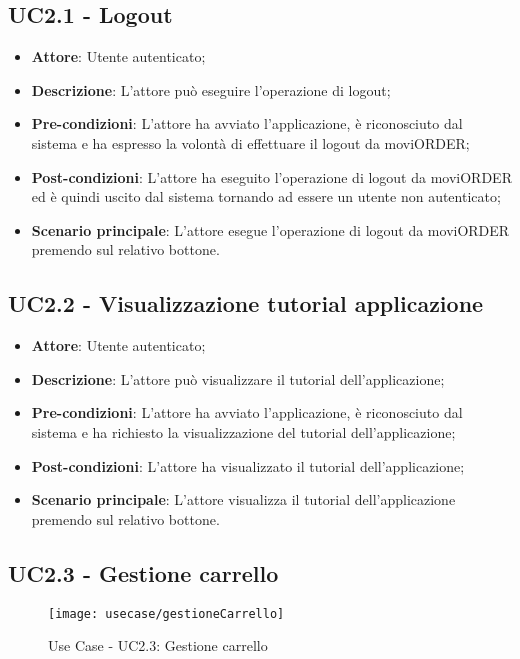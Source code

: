 \subsection{UC2.1 - Logout}

\begin{itemize}
	\item \textbf{Attore}: Utente autenticato;
	\item \textbf{Descrizione}: L'attore può eseguire l'operazione di logout;
	\item \textbf{Pre-condizioni}: L'attore ha avviato l'applicazione, è riconosciuto dal sistema e ha espresso la volontà di effettuare il logout da moviORDER;
	\item \textbf{Post-condizioni}: L'attore ha eseguito l'operazione di logout da moviORDER ed è quindi uscito dal sistema tornando ad essere un utente non autenticato;
	\item \textbf{Scenario principale}: L'attore esegue l'operazione di logout da moviORDER premendo sul relativo bottone.
\end{itemize}

\subsection{UC2.2 - Visualizzazione tutorial applicazione}

\begin{itemize}
	\item \textbf{Attore}: Utente autenticato;
	\item \textbf{Descrizione}: L'attore può visualizzare il tutorial dell'applicazione;
	\item \textbf{Pre-condizioni}: L'attore ha avviato l'applicazione, è riconosciuto dal sistema e ha richiesto la visualizzazione del tutorial dell'applicazione;
	\item \textbf{Post-condizioni}: L'attore ha visualizzato il tutorial dell'applicazione;
	\item \textbf{Scenario principale}: L'attore visualizza il tutorial dell'applicazione premendo sul relativo bottone.
\end{itemize}

\newpage

\subsection{UC2.3 - Gestione carrello}

\begin{figure}[!h] 
    \centering 
    \texttt{[image: usecase/gestioneCarrello]} 
    \caption{Use Case - UC2.3: Gestione carrello}
\end{figure}

